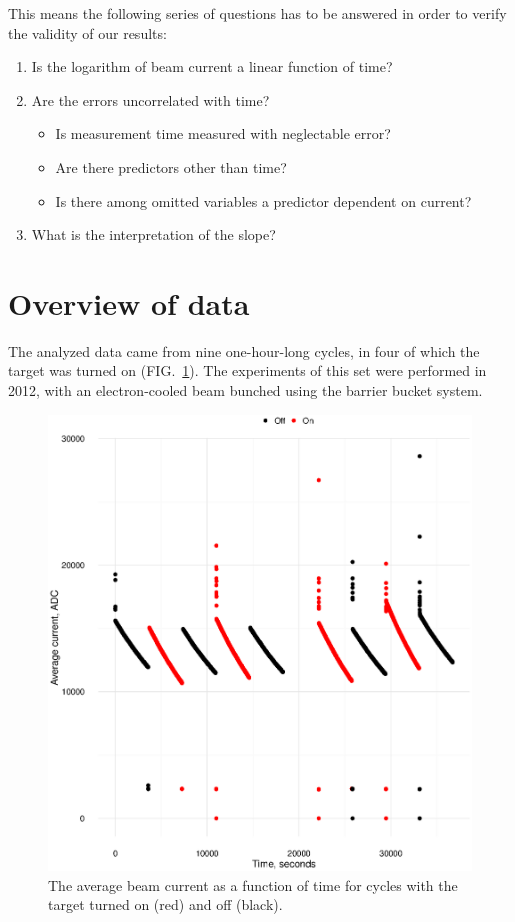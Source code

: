 \documentclass[reprint]{revtex4-1}
\newcommand{\scl}{.43}
\begin{document}
This means the following series of questions has to be answered in order to verify the validity of our results:
\begin{enumerate}
	\item Is the logarithm of beam current a linear function of time?
	\item Are the errors uncorrelated with time?
		\begin{itemize}
			\item Is measurement time measured with neglectable error?
			\item Are there predictors other than time?
			\item Is there among omitted variables a predictor dependent on current?
		\end{itemize}
	\item What is the interpretation of the slope?
\end{enumerate}


\section{Overview of data}
The analyzed data came from nine one-hour-long cycles, in four of which the target was turned on (FIG.~\ref{fig:TheNine}). The experiments of this set were performed in 2012, with an electron-cooled beam bunched using the barrier bucket system.

\begin{figure}[h]
\includegraphics[scale=\scl]{img/TheNineCycles.eps}
\caption{The average beam current as a function of time for cycles with the target turned on (red) and off (black).\label{fig:TheNine}}
\end{figure} 
\end{document}
